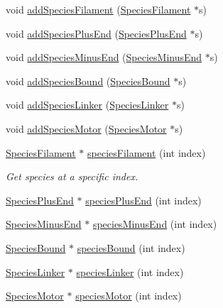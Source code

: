 {\bf }\par
\begin{DoxyCompactItemize}
\item 
void \hyperlink{classCMonomer_a3cdb15e3d7f2143217ad3b002337e8b1}{add\+Species\+Filament} (\hyperlink{classSpeciesFilament}{Species\+Filament} $\ast$s)
\item 
void \hyperlink{classCMonomer_a3c2a4890f5a040cdf19a150030db434c}{add\+Species\+Plus\+End} (\hyperlink{classSpeciesPlusEnd}{Species\+Plus\+End} $\ast$s)
\item 
void \hyperlink{classCMonomer_ace655af18907f289683d00f6e7597b71}{add\+Species\+Minus\+End} (\hyperlink{classSpeciesMinusEnd}{Species\+Minus\+End} $\ast$s)
\item 
void \hyperlink{classCMonomer_a64f136517ed2ff2d15aaa5c9bd4d9153}{add\+Species\+Bound} (\hyperlink{classSpeciesBound}{Species\+Bound} $\ast$s)
\item 
void \hyperlink{classCMonomer_a06bfb6c661455b50d8f125cec4a06485}{add\+Species\+Linker} (\hyperlink{classSpeciesLinker}{Species\+Linker} $\ast$s)
\item 
void \hyperlink{classCMonomer_a57b8bf84368ddc0f8bfafaeaec508132}{add\+Species\+Motor} (\hyperlink{classSpeciesMotor}{Species\+Motor} $\ast$s)
\end{DoxyCompactItemize}

{\bf }\par
\begin{DoxyCompactItemize}
\item 
\hyperlink{classSpeciesFilament}{Species\+Filament} $\ast$ \hyperlink{classCMonomer_ad69c6060f307b00463bf59b697846344}{species\+Filament} (int index)
\begin{DoxyCompactList}\small\item\em Get species at a specific index. \end{DoxyCompactList}\item 
\hyperlink{classSpeciesPlusEnd}{Species\+Plus\+End} $\ast$ \hyperlink{classCMonomer_a1923cdc3adc910d1eb83bb6873b9864c}{species\+Plus\+End} (int index)
\item 
\hyperlink{classSpeciesMinusEnd}{Species\+Minus\+End} $\ast$ \hyperlink{classCMonomer_a61893c36bc55172a9a534b1caebc7b8b}{species\+Minus\+End} (int index)
\item 
\hyperlink{classSpeciesBound}{Species\+Bound} $\ast$ \hyperlink{classCMonomer_a237d02b3b2e0ecf83ed798f2c0107250}{species\+Bound} (int index)
\item 
\hyperlink{classSpeciesLinker}{Species\+Linker} $\ast$ \hyperlink{classCMonomer_a71d55b070c58b90f439c0f9fd14efe4f}{species\+Linker} (int index)
\item 
\hyperlink{classSpeciesMotor}{Species\+Motor} $\ast$ \hyperlink{classCMonomer_a8cfa76dbac04ef9eeca54b93208e064f}{species\+Motor} (int index)
\end{DoxyCompactItemize}

